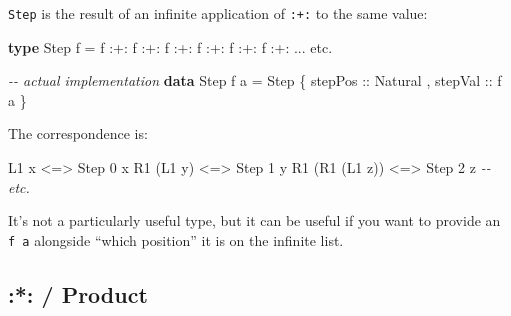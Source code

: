 \documentclass[]{article}
\newenvironment{Shaded}{}{}
\newcommand{\CommentTok}[1]{\textcolor[rgb]{0.38,0.63,0.69}{\textit{#1}}}
\newcommand{\DataTypeTok}[1]{\textcolor[rgb]{0.56,0.13,0.00}{#1}}
\newcommand{\DecValTok}[1]{\textcolor[rgb]{0.25,0.63,0.44}{#1}}
\newcommand{\KeywordTok}[1]{\textcolor[rgb]{0.00,0.44,0.13}{\textbf{#1}}}
\newcommand{\NormalTok}[1]{#1}
\newcommand{\OperatorTok}[1]{\textcolor[rgb]{0.40,0.40,0.40}{#1}}
\newcommand{\OtherTok}[1]{\textcolor[rgb]{0.00,0.44,0.13}{#1}}
\begin{document}
\begin{itemize}
  \texttt{Step} is the result of an infinite application of \texttt{:+:} to the
  same value:

\begin{Shaded}
\begin{Highlighting}[]
\KeywordTok{type} \DataTypeTok{Step}\NormalTok{ f }\OtherTok{=}\NormalTok{ f }\OperatorTok{:+:}\NormalTok{ f }\OperatorTok{:+:}\NormalTok{ f }\OperatorTok{:+:}\NormalTok{ f }\OperatorTok{:+:}\NormalTok{ f }\OperatorTok{:+:}\NormalTok{ f }\OperatorTok{:+:} \OperatorTok{...}\NormalTok{ etc}\OperatorTok{.}

\CommentTok{{-}{-} actual implementation}
\KeywordTok{data} \DataTypeTok{Step}\NormalTok{ f a }\OtherTok{=} \DataTypeTok{Step}
\NormalTok{  \{}\OtherTok{ stepPos ::} \DataTypeTok{Natural}
\NormalTok{  ,}\OtherTok{ stepVal ::}\NormalTok{ f a}
\NormalTok{  \}}
\end{Highlighting}
\end{Shaded}

  The correspondence is:

\begin{Shaded}
\begin{Highlighting}[]
\DataTypeTok{L1}\NormalTok{ x           }\OperatorTok{<=>} \DataTypeTok{Step} \DecValTok{0}\NormalTok{ x}
\DataTypeTok{R1}\NormalTok{ (}\DataTypeTok{L1}\NormalTok{ y)      }\OperatorTok{<=>} \DataTypeTok{Step} \DecValTok{1}\NormalTok{ y}
\DataTypeTok{R1}\NormalTok{ (}\DataTypeTok{R1}\NormalTok{ (}\DataTypeTok{L1}\NormalTok{ z)) }\OperatorTok{<=>} \DataTypeTok{Step} \DecValTok{2}\NormalTok{ z}
\CommentTok{{-}{-} etc.}
\end{Highlighting}
\end{Shaded}

  It's not a particularly useful type, but it can be useful if you want to
  provide an \texttt{f\ a} alongside ``which position'' it is on the infinite
  list.
\end{itemize}

\hypertarget{product}{%
\subsection{:*: / Product}\label{product}}
\end{document}
